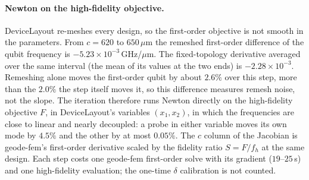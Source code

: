 \documentclass{anvil-paper}
\begin{document}
\paragraph{Newton on the high-fidelity objective.}
DeviceLayout re-meshes every design, so the first-order objective is not
smooth in the parameters. From $c = 620$ to $650\,\mu$m the remeshed
first-order difference of the qubit frequency is
$-5.23\times10^{-3}$\,GHz/$\mu$m. The fixed-topology derivative averaged
over the same interval (the mean of its values at the two ends) is
$-2.28\times10^{-3}$. Remeshing alone moves the first-order qubit by
about $2.6\%$ over this step, more than the $2.0\%$ the step itself moves
it, so this difference measures remesh noise, not the slope. The iteration
therefore runs Newton directly on the high-fidelity objective $F$, in
DeviceLayout's variables $(x_1, x_2)$, in which the frequencies are close
to linear and nearly decoupled: a probe in either variable moves its own
mode by $4.5\%$ and the other by at most $0.05\%$. The $c$ column of the
Jacobian is geode-fem's first-order derivative scaled by the fidelity
ratio $S = F/f_h$ at the same design. Each step costs one geode-fem
first-order solve with its gradient ($19$--$25$\,s) and one high-fidelity
evaluation; the one-time $\delta$ calibration is not counted.
\end{document}
